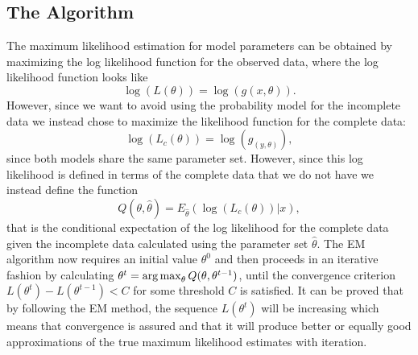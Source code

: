 \subsection{The Algorithm}
The maximum likelihood estimation for model parameters can be obtained by maximizing the log likelihood function for the observed data, where the log likelihood function looks like
\begin{equation*}
\log (L(\theta))=\log (g(x,\theta)).
\end{equation*}
However, since we want to avoid using the probability model for the incomplete data we instead chose to maximize the likelihood function for the complete data:
\begin{equation*}
\log (L_c(\theta))=\log (g_(y,\theta)),
\end{equation*}
since both models share the same parameter set. However, since this log likelihood is defined in terms of the complete data that we do not have we instead define the function
\begin{equation}
Q(\theta,\hat \theta)= E_{\hat \theta}(\log(L_c(\theta))|x),
\end{equation}
that is the conditional expectation of the log likelihood for the complete data given the incomplete data calculated using the parameter set $\hat\theta$. The EM algorithm now requires an initial value $\theta^0$ and then proceeds in an iterative fashion by calculating $\theta^t=\operatorname*{arg\,max}_\theta Q(\theta,\theta^{t-1})$, until the convergence criterion $L(\theta^t)-L(\theta^{t-1})<C$ for some threshold $C$ is satisfied. It can be proved that by following the EM method, the sequence $L(\theta^t)$ will be increasing which means that convergence is assured and that it will produce better or equally good approximations of the true maximum likelihood estimates with iteration. 


